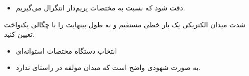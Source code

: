 \begin{ELunit}
\begin{itemize}
\begin{itemize}
    \begin{itemize}
    \tightlist
    \item
      دقت شود که نسبت به مختصات پریم‌دار انتگرال می‌گیریم.
    \end{itemize}
  \end{itemize}
\end{itemize}

\end{ELunit}


\begin{ELexample}{}

شدت میدان الکتریکی یک بار خطی مستقیم و به طول بینهایت را با چگالی یکنواخت \ELim{\rho_\ell} تعیین کنید.


\begin{ELsolution}


\begin{itemize}
\tightlist
\item
  انتخاب دستگاه مختصات استوانه‌ای
\end{itemize}


\begin{itemize}
\tightlist
\item
  به صورت شهودی واضح است که میدان مولفه در راستای  ندارد.
\end{itemize}


\end{ELsolution}

\end{ELexample}


